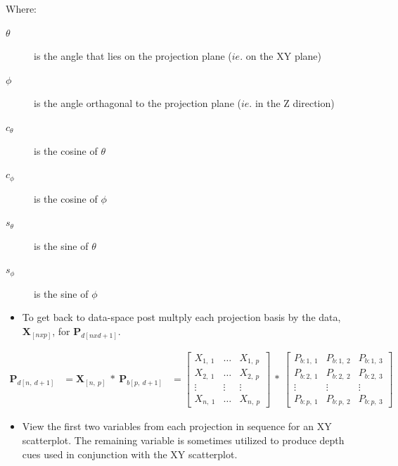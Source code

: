 \documentclass{monashthesis}
\begin{document}
Where:

\begin{description}
  \item[$\theta$] is the angle that lies on the projection plane ($ie.$ on the XY plane)
  \item[$\phi$] is the angle orthagonal to the projection plane ($ie.$ in the Z direction)
  \item[$c_\theta$] is the cosine of $\theta$
  \item[$c_\phi$]   is the cosine of $\phi$
  \item[$s_\theta$] is the sine of   $\theta$
  \item[$s_\phi$]   is the sine of   $\phi$
\end{description}

\begin{itemize}
\tightlist
\item
  To get back to data-space post multply each projection basis by the
  data, \(\textbf{X}_{[n x p]}\), for \(\textbf{P}_{d[n x d+1]}\).
\end{itemize}

\begin{align}
  \textbf{P}_{d[n,~d+1]}
    &= \textbf{X}_{[n,~p]} ~*~ \textbf{P}_{b[p,~d+1]}
    &= \begin{bmatrix}
      X_{1,~1} & \dots & X_{1,~p} \\
      X_{2,~1} & \dots & X_{2,~p} \\
      \vdots   & \vdots & \vdots  \\
      X_{n,~1} & \dots & X_{n,~p}
    \end{bmatrix}
      ~*~
    \begin{bmatrix}
      P_{b:1,~1} & P_{b:1,~2} & P_{b:1,~3} \\
      P_{b:2,~1} & P_{b:2,~2} & P_{b:2,~3} \\
      \vdots     & \vdots     & \vdots     \\
      P_{b:p,~1} & P_{b:p,~2} & P_{b:p,~3}
    \end{bmatrix}
\end{align}

\begin{itemize}
\tightlist
\item
  View the first two variables from each projection in sequence for an
  XY scatterplot. The remaining variable is sometimes utilized to
  produce depth cues used in conjunction with the XY scatterplot.
\end{itemize}
\end{document}

